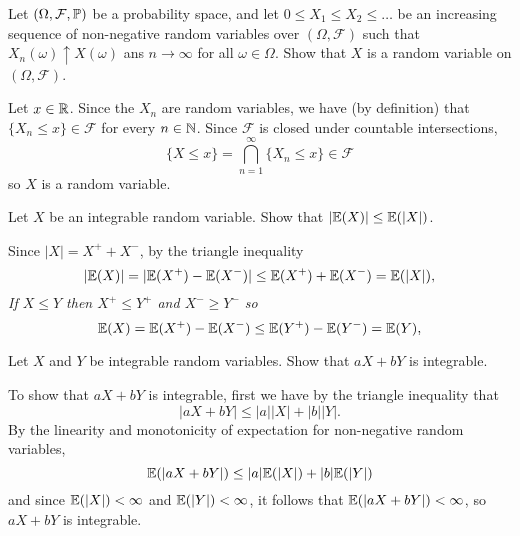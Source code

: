 \begin{exercise}
\begin{questions}
\question
Let $(\Omega,\mathcal{F},\mathbb{P})$ be a probability space, and let $0\leq X_1\leq X_2 \leq \ldots$ be an increasing sequence of non-negative random variables over $(\Omega,\mathcal{F})$ such that 
$X_n(\omega) \uparrow X(\omega)$ ans $n\to\infty$ for all $\omega\in\Omega$.
Show that $X$ is a random variable on $(\Omega,\mathcal{F})$.
\begin{answer}
Let $x\in\mathbb{R}$. Since the $X_n$ are random variables, we have (by definition) that $\{X_n \leq x\}\in\mathcal{F}$ for every $n\in\mathbb{N}$. Since $\mathcal{F}$ is closed under countable intersections, 
\[
\{X\leq x\} = \bigcap_{n=1}^{\infty} \{X_n \leq x\} \in\mathcal{F}
\]
so $X$ is a random variable.
\end{answer}

\question
Let $X$ be an integrable random variable. Show that $|\mathbb{E}(X)|\leq \mathbb{E}(|X|)$.
\begin{answer}
Since $|X|=X^{+}+X^{-}$, by the triangle inequality
\[
|\mathbb{E}(X)| = |\mathbb{E}(X^{+})-\mathbb{E}(X^{-})| \leq \mathbb{E}(X^{+}) + \mathbb{E}(X^{-}) = \mathbb{E}(|X|),
\]
\it If $X\leq Y$ then $X^{+}\leq Y^{+}$ and $X^{-}\geq Y^{-}$ so
\[
\mathbb{E}(X) = \mathbb{E}(X^{+})-\mathbb{E}(X^{-}) \leq \mathbb{E}(Y^{+})-\mathbb{E}(Y^{-}) = \mathbb{E}(Y),
\]
\end{answer}

\question
Let $X$ and $Y$ be integrable random variables. Show that $aX+bY$ is integrable.
\begin{answer}
To show that $aX+bY$ is integrable, first we have by the triangle inequality that
\[
|aX+bY| \leq |a||X| + |b||Y|.
\]
By the linearity and monotonicity of expectation for non-negative random variables,
\[
\mathbb{E}(|aX+bY|) \leq |a|\mathbb{E}(|X|) + |b|\mathbb{E}(|Y|)
\]
and since $\mathbb{E}(|X|)<\infty$ and $\mathbb{E}(|Y|)<\infty$, it follows that $\mathbb{E}(|aX+bY|)<\infty$, so $aX+bY$ is integrable.
\end{answer}

\end{questions}
\end{exercise}

\endinput

